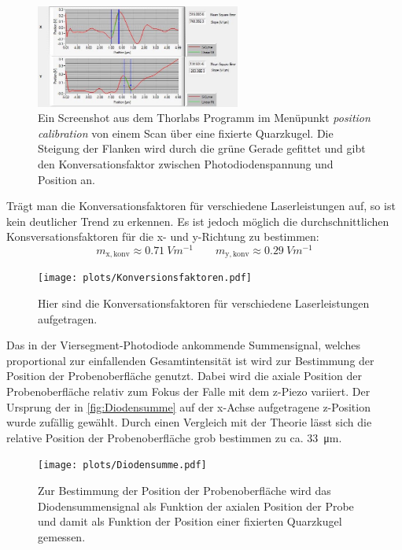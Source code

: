     \begin{figure}[ht]
        \centering\captionsetup{format=plain}
        \includegraphics[width=0.6\textwidth]{bilder/PosCal_200mA.JPG}
        \caption{Ein Screenshot aus dem Thorlabs Programm im Menüpunkt \glqq \textit{position calibration} von einem Scan über eine fixierte Quarzkugel. Die Steigung der Flanken wird durch die grüne Gerade gefittet und gibt den Konversationsfaktor zwischen Photodiodenspannung und Position an.}
        \label{fig:PosCal_200mA}
    \end{figure}
    \FloatBarrier
    Trägt man die Konversationsfaktoren für verschiedene Laserleistungen auf, so ist kein deutlicher Trend zu erkennen.
    Es ist jedoch möglich die durchschnittlichen Konsversationsfaktoren für die x- und y-Richtung zu bestimmen:
    \begin{equation*}
        m_{\mathrm{x,konv}} \approx \qty{0,71}{V m^{-1}} \qquad m_{\mathrm{y,konv}} \approx \qty{0,29}{V m^{-1}}
    \end{equation*}
    \begin{figure}[ht]
        \centering\captionsetup{format=plain}
        \texttt{[image: plots/Konversionsfaktoren.pdf]} \vspace*{-0.5cm}
        \caption{Hier sind die Konversationsfaktoren für verschiedene Laserleistungen aufgetragen.}
        \label{fig:Konversionsfaktoren}
    \end{figure}
    \FloatBarrier
    Das in der Viersegment-Photodiode ankommende Summensignal, welches proportional zur einfallenden Gesamtintensität ist wird zur Bestimmung der Position der Probenoberfläche genutzt.
    Dabei wird die axiale Position der Probenoberfläche relativ zum Fokus der Falle mit dem z-Piezo variiert.
    Der Ursprung der in \autoref{fig:Diodensumme} auf der x-Achse aufgetragene z-Position wurde zufällig gewählt.
    Durch einen Vergleich mit der Theorie lässt sich die relative Position der Probenoberfläche grob bestimmen zu ca. \qty{33}{\um}.
    \begin{figure}[ht]
        \centering\captionsetup{format=plain}
        \texttt{[image: plots/Diodensumme.pdf]} \vspace*{-0.5cm}
        \caption{Zur Bestimmung der Position der Probenoberfläche wird das Diodensummensignal als Funktion der axialen Position der Probe und damit als Funktion der Position einer fixierten Quarzkugel gemessen.}
        \label{fig:Diodensumme}
    \end{figure}
    \FloatBarrier

